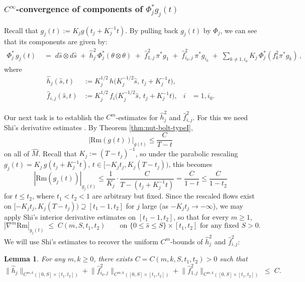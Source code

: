 \documentclass[11pt]{amsart}
\theoremstyle{plain}
\numberwithin{equation}{section}
\newtheorem{lemma}[theorem]{Lemma}
\theoremstyle{definition}
\theoremstyle{remark}
\begin{document}
\subsubsection{$C^\infty$-convergence of components of $\Phi_j^*g_j(t)$}
Recall that $g_j(t) := K_j g(t_j + K_j^{-1}t)$. By pulling back $g_j(t)$ by $\Phi_j$, we can see that its components are given by:
\begin{align}\label{eq:pullback_by_Phi}
\Phi_j^* \, g_j (t) & \;=\; d \hat{s} \otimes d \hat{s} \;+\; \hat{h}_j^2 \, \Phi_j^*(\theta \otimes \theta) \;+\; \hat{f}_{1, j}^2 \, \pi^* g_1 \;+\; \hat{f}_{i_0, j}^2 \, \pi^* g_{i_0} \;+\; \sum_{k \neq 1,i_0} K_j \, \Phi_j^*(f_k^2 \pi^* g_k) \,,
\end{align}
where 
\begin{align*}
	\hat{h}_j ( \hat{s}, t ) & := K_j^{1/2} \, h \big( K_j^{-1/2} \hat{s}, \, t_j + K_j^{-1} t \big),\\
	\hat{f}_{i, j} ( \hat{s}, t ) & := K_j^{1/2} \, f_i \big( K_j^{-1/2} \hat{s}, \, t_j + K_j^{-1} t \big), & i & = 1, i_0.
\end{align*}

Our next task is to establish the $C^m$-estimates for $\hat{h}_j^2$ and $\hat{f}_{i,j}^2$. For this we need Shi's derivative estimates \cite{Shi}. By Theorem \ref{thm:nut-bolt-typeI},
\[| \mathrm{Rm} ( g (t) ) |_{g(t)} \leq \frac{C}{T - t }\]
on all of $\widehat{M}$. Recall that $K_j := (T-t_j)^{-1}$, so under the parabolic rescaling $g_j ( t ) = K_j \, g ( t_j + K_j^{-1} t )$, $t \in [-K_jt_j, K_j(T-t_j))$, this becomes
\[|\mathrm{Rm} ( g_j (t) ) |_{g_j (t)} \leq \frac{1}{K_j} \cdot \frac{C}{T-(t_j + K_j^{-1}t)} = \frac{C}{1 - t} \leq \frac{C}{1 - t_2}\]
for $t \leq t_2$, where $t_1 < t_2 < 1$ are arbitrary but fixed. Since the rescaled flows exist on $[ - K_j t_j, K_j(T - t_j) ) \supseteq [ t_1 - 1, t_2 ]$ for $j$ large (as $- K_j t_j \to - \infty$), we may apply Shi's interior derivative estimates \cite{Shi} on $[ t_1 - 1, t_2 ]$, so that for every $m \geq 1$,
\begin{equation}\label{eq:Shi_m}
| \nabla^m \mathrm{Rm} |_{g_j (t)} \;\leq\; C(m, S, t_1, t_2 ) \qquad \text{on } \{ 0 \leq \hat{s} \leq S \} \times [ t_1, t_2 ] \text{ for any fixed } S > 0.
\end{equation}
We will use Shi's estimates to recover the uniform $C^m$-bounds of $\hat{h}_j^2$ and $\hat{f}_{i,j}^2$:
\begin{lemma}
\label{lma:Cm-estimates}
For any $m,k \geq 0$, there exists $C = C(m,k,S,t_1,t_2) > 0$ such that
\begin{equation}\label{eq:Cmk}
\big\| \hat{h}_j \big\|_{C^{m,k}([0,S]\times[t_1,t_2])} + \big\| \hat{f}_{i_0, j}^2 \big\|_{C^{m,k}([0,S]\times[t_1,t_2])} + \big\| \hat{f}_{1, j}^2 \big\|_{C^{m,k}([0,S]\times[t_1,t_2])} \;\leq\; C.
\end{equation}
\end{lemma}
\end{document}
